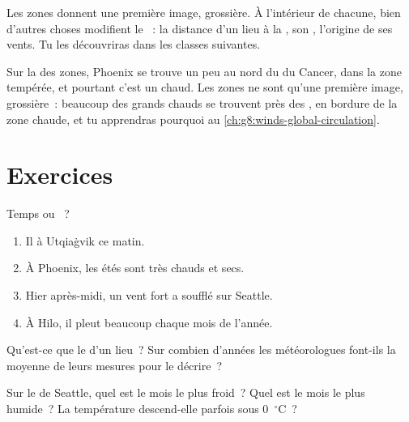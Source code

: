 Les zones donnent une première image, grossière. À l'intérieur de chacune,
bien d'autres choses modifient le ~: la distance d'un lieu à la ,
son , l'origine de ses vents. Tu les découvriras dans les classes
suivantes.

\begin{remark}\label{rem:g5:weather-and-climate:phoenix}
Sur la  des zones, Phoenix se trouve un peu au nord du  du
Cancer, dans la zone tempérée, et pourtant c'est un  chaud. Les zones
ne sont qu'une première image, grossière~: beaucoup des grands 
chauds se trouvent près des , en bordure de la zone chaude, et tu
apprendras pourquoi au \cref{ch:g8:winds-global-circulation}.
\end{remark}

\section{Exercices}

\begin{exercise}[$\star$]\label{exo:g5:weather-and-climate:1}
Temps ou ~?
\begin{enumerate}
  \item[(a)] Il  à Utqiaġvik ce matin.
  \item[(b)] À Phoenix, les étés sont très chauds et secs.
  \item[(c)] Hier après-midi, un vent fort a soufflé sur Seattle.
  \item[(d)] À Hilo, il pleut beaucoup chaque mois de l'année.
\end{enumerate}
\end{exercise}

\begin{exercise}[$\star$]\label{exo:g5:weather-and-climate:2}
Qu'est-ce que le  d'un lieu~? Sur combien d'années les météorologues
font-ils la moyenne de leurs mesures pour le décrire~?
\end{exercise}

\begin{exercise}[$\star$]\label{exo:g5:weather-and-climate:3}
Sur le  de Seattle, quel est le mois le plus froid~?
Quel est le mois le plus humide~? La température descend-elle parfois sous
0~$^\circ$C~?
\end{exercise}

